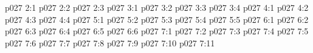 \vs p027 2:1 
\vs p027 2:2 
\vs p027 2:3 
\vs p027 3:1 
\vs p027 3:2 
\vs p027 3:3 
\vs p027 3:4 
\vs p027 4:1 
\vs p027 4:2 
\vs p027 4:3 
\vs p027 4:4 
\vs p027 5:1 
\vs p027 5:2 
\vs p027 5:3 
\vs p027 5:4 
\vs p027 5:5 
\vs p027 6:1 
\vs p027 6:2 
\vs p027 6:3 
\vs p027 6:4 
\vs p027 6:5 
\vs p027 6:6 
\vs p027 7:1 
\vs p027 7:2 \pc 
\vs p027 7:3 
\vs p027 7:4 \pc 
\vs p027 7:5 
\vs p027 7:6 
\vs p027 7:7 
\vs p027 7:8 \pc 
\vs p027 7:9 \pc 
\vs p027 7:10 
\vsetoff
\vs p027 7:11 
\quizlink
